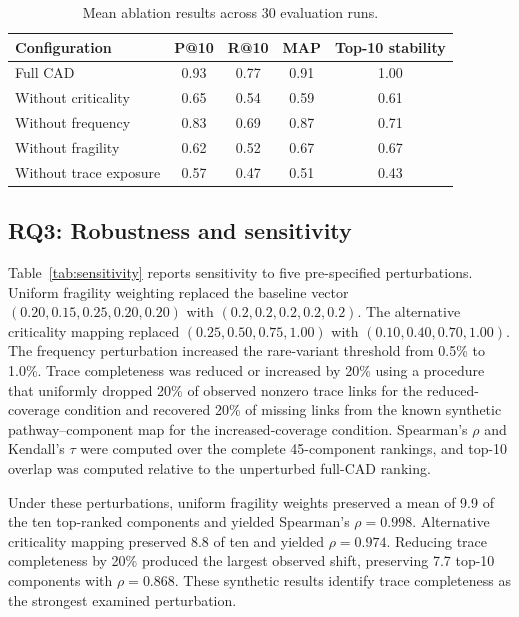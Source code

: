 \documentclass[english,preprint]{elsarticle}
\newcommand{\CAD}{\textsc{CAD}\xspace}
\begin{document}
\begin{table}[htbp]
\caption{Mean ablation results across 30 evaluation runs.}
\label{tab:ablation}
\small
\begin{tabularx}{\textwidth}{@{}Ycccc@{}}
\toprule
\textbf{Configuration} & \textbf{P@10} & \textbf{R@10} & \textbf{MAP} & \textbf{Top-10 stability} \\
\midrule
Full \CAD & 0.93 & 0.77 & 0.91 & 1.00 \\
Without criticality & 0.65 & 0.54 & 0.59 & 0.61 \\
Without frequency & 0.83 & 0.69 & 0.87 & 0.71 \\
Without fragility & 0.62 & 0.52 & 0.67 & 0.67 \\
Without trace exposure & 0.57 & 0.47 & 0.51 & 0.43 \\
\bottomrule
\end{tabularx}
\end{table}

\subsection{RQ3: Robustness and sensitivity}

Table~\ref{tab:sensitivity} reports sensitivity to five pre-specified perturbations. Uniform fragility weighting replaced the baseline vector $(0.20,0.15,0.25,0.20,0.20)$ with $(0.2,0.2,0.2,0.2,0.2)$. The alternative criticality mapping replaced $(0.25,0.50,0.75,1.00)$ with $(0.10,0.40,0.70,1.00)$. The frequency perturbation increased the rare-variant threshold from 0.5\% to 1.0\%. Trace completeness was reduced or increased by 20\% using a procedure that uniformly dropped 20\% of observed nonzero trace links for the reduced-coverage condition and recovered 20\% of missing links from the known synthetic pathway--component map for the increased-coverage condition. Spearman's $\rho$ and Kendall's $\tau$ were computed over the complete 45-component rankings, and top-10 overlap was computed relative to the unperturbed full-\CAD ranking.

Under these perturbations, uniform fragility weights preserved a mean of 9.9 of the ten top-ranked components and yielded Spearman's $\rho=0.998$. Alternative criticality mapping preserved 8.8 of ten and yielded $\rho=0.974$. Reducing trace completeness by 20\% produced the largest observed shift, preserving 7.7 top-10 components with $\rho=0.868$. These synthetic results identify trace completeness as the strongest examined perturbation.
\end{document}
